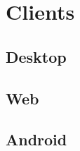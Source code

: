 \section{Clients}
\subsection{Desktop}
\FloatBarrier
\subsection{Web}

\FloatBarrier
\subsection{Android}

